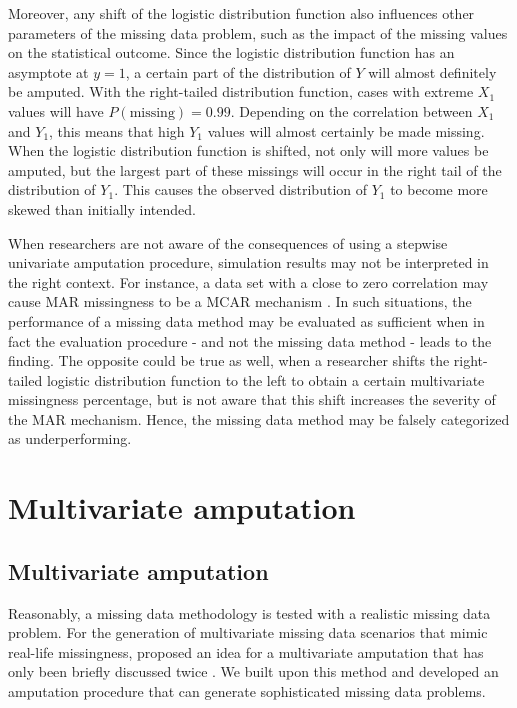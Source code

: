 \documentclass[11pt,a4paper]{article}
\begin{document}
Moreover, any shift of the logistic distribution function also influences other parameters of the missing data problem, such as the impact of the missing values on the statistical outcome. Since the logistic distribution function has an asymptote at $y = 1$, a certain part of the distribution of $Y$ will almost definitely be amputed. With the right-tailed distribution function, cases with extreme $X_1$ values will have $P(\text{missing}) = 0.99$. Depending on the correlation between $X_1$ and $Y_1$, this means that high $Y_1$ values will almost certainly be made missing. When the logistic distribution function is shifted, not only will more values be amputed, but the largest part of these missings will occur in the right tail of the distribution of $Y_1$. This causes the observed distribution of $Y_1$ to become more skewed than initially intended. 

When researchers are not aware of the consequences of using a stepwise univariate amputation procedure, simulation results may not be interpreted in the right context. For instance, a data set with a close to zero correlation may cause MAR missingness to be a MCAR mechanism \citep{Vink2016}. In such situations, the performance of a missing data method may be evaluated as sufficient when in fact the evaluation procedure - and not the missing data method - leads to the finding. The opposite could be true as well, when a researcher shifts the right-tailed logistic distribution function to the left to obtain a certain multivariate missingness percentage, but is not aware that this shift increases the severity of the MAR mechanism. Hence, the missing data method may be falsely categorized as underperforming.

\section{Multivariate amputation}

\subsection{\normalsize Multivariate amputation}\label{method}

Reasonably, a missing data methodology is tested with a realistic missing data problem. For the generation of multivariate missing data scenarios that mimic real-life missingness, \citet[][pp. 110 - 113]{Jaap1999} proposed an idea for a multivariate amputation that has only been briefly discussed twice \citep{Stef2006, Jaap2003}. We built upon this method and developed an amputation procedure that can generate sophisticated missing data problems. 
\end{document}
